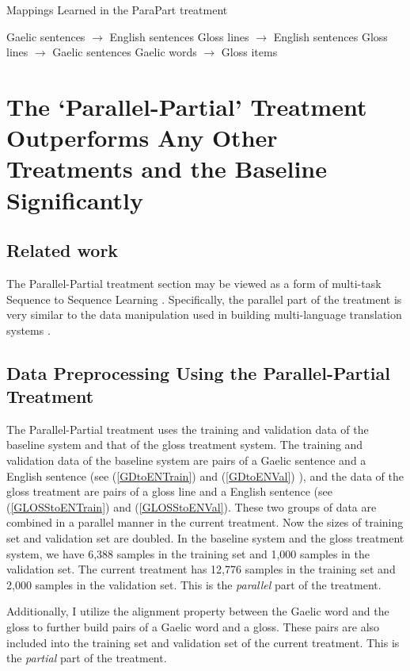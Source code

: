 \documentclass[final]{ua-thesis}
\numberwithin{equation}{section}
\begin{document}
\begin{exe}
	\ex Mappings Learned in the ParaPart treatment
	\begin{xlist}
		\ex Gaelic sentences $\rightarrow$ English sentences
		\ex Gloss lines $\rightarrow$ English sentences
		\ex Gloss lines $\rightarrow$ Gaelic sentences
		\ex Gaelic words $\rightarrow$ Gloss items
	\end{xlist}	
\end{exe}    

\section{The `Parallel-Partial' Treatment Outperforms Any Other Treatments and the Baseline Significantly}

\subsection{Related work}
The Parallel-Partial treatment section may be viewed as a form of multi-task Sequence to Sequence Learning \citep{luong2015multi}. Specifically, the parallel part of the treatment is very similar to the data manipulation used in building multi-language translation systems \citep{google_zero_shot}.  

\subsection{Data Preprocessing Using the Parallel-Partial Treatment}
The Parallel-Partial treatment uses the training and validation data of the baseline system and that of the gloss treatment system.  
The training and validation data of the baseline system are pairs of a Gaelic sentence and a English sentence (see (\ref{GDtoENTrain}) and (\ref{GDtoENVal}) ), 
and the data of the gloss treatment are pairs of a gloss line and a English sentence (see (\ref{GLOSStoENTrain}) and (\ref{GLOSStoENVal}). 
These two groups of data are combined in a parallel manner in the current treatment. Now the sizes of training set and validation set are doubled. In the baseline system and the gloss treatment system, we have 6,388 samples in the training set and 1,000 samples in the validation set. The current treatment has 12,776 samples in the training set and 2,000 samples in the validation set. This is the \textit{parallel} part of the treatment. 

Additionally, I utilize the alignment property between the Gaelic word and the gloss to further build pairs of a Gaelic word and a gloss. These pairs are also included into the training set and validation set of the current treatment. This is the \textit{partial} part of the treatment.   
\end{document}

